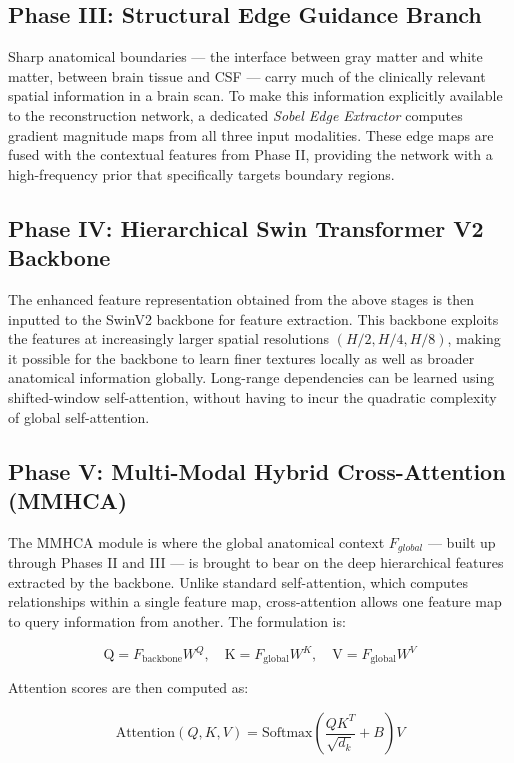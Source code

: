 \subsection{Phase III: Structural Edge Guidance Branch}
Sharp anatomical boundaries — the interface between gray matter and white matter, between brain tissue and CSF — carry much of the clinically relevant spatial information in a brain scan. To make this information explicitly available to the reconstruction network, a dedicated \textit{Sobel Edge Extractor} computes gradient magnitude maps from all three input modalities. These edge maps are fused with the contextual features from Phase II, providing the network with a high-frequency prior that specifically targets boundary regions.

\subsection{Phase IV: Hierarchical Swin Transformer V2 Backbone}
The enhanced feature representation obtained from the above stages is then inputted to the SwinV2 backbone for feature extraction. This backbone exploits the features at increasingly larger spatial resolutions $(H / 2, H / 4, H / 8)$, making it possible for the backbone to learn finer textures locally as well as broader anatomical information globally. Long-range dependencies can be learned using shifted-window self-attention, without having to incur the quadratic complexity of global self-attention.

\subsection{Phase V: Multi-Modal Hybrid Cross-Attention (MMHCA)}
The MMHCA module is where the global anatomical context $F_{global}$ — built up through Phases II and III — is brought to bear on the deep hierarchical features extracted by the backbone. Unlike standard self-attention, which computes relationships within a single feature map, cross-attention allows one feature map to query information from another. The formulation is:

\begin{equation}
    \text{Q} = F_{\text{backbone}} W^Q, \quad \text{K} = F_{\text{global}} W^K, \quad \text{V} = F_{\text{global}} W^V
\end{equation}

Attention scores are then computed as:

\begin{equation}
    \text{Attention}(Q, K, V) = \text{Softmax}\!\left(\frac{QK^T}{\sqrt{d_k}} + B\right)V
\end{equation}


